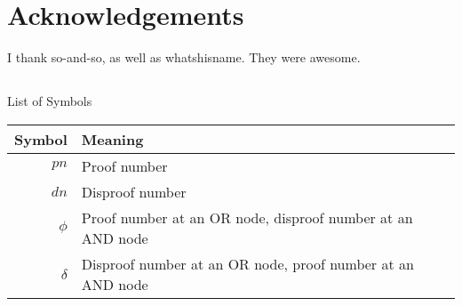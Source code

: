 \documentclass[12pt, letterpaper]{report}
\numberwithin{equation}{section}
\begin{document}
  \newpage 
   \chapter*{Acknowledgements}
   \thispagestyle{empty}
   \vspace*{-0.7in}
   \small{
  I thank so-and-so, as well as whatshisname. They were awesome.
  }
  
  \newpage
  \normalsize
  \tableofcontents 
  
  \newpage
  \listoffigures

  \newpage  
  \listoftables
  
  \newpage
  \thispagestyle{empty}
  \section*{}
  \begin{flushright}
    \huge{List of Symbols}
  \end{flushright}
  \vspace{0.4in}
  \begin{center}
    \begin{tabular}{rl}
      Symbol & Meaning\\
      \hline
      $pn$           & Proof number \\
      $dn$           & Disproof number \\
      $\phi$         & Proof number at an OR node, disproof number at an AND node \\
      $\delta$       & Disproof number at an OR node, proof number at an AND node \\
    \end{tabular}
  \end{center}
  
  \newpage
  \thispagestyle{empty}
\end{document}
